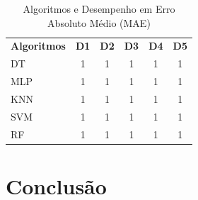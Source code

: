 \documentclass[12pt]{article}
\begin{document}
\begin{table}[h!]
  \begin{center}
    \caption{Algoritmos e Desempenho em Erro Absoluto Médio (MAE) }
    \label{tab_desempenho}
    \begin{tabular}{l|c|c|c|c|c}
      \textbf{Algoritmos} & \textbf{D1} & \textbf{D2} & \textbf{D3} & \textbf{D4} & \textbf{D5} \\
      DT                  & 1           & 1           & 1           & 1           & 1           \\
      MLP                 & 1           & 1           & 1           & 1           & 1           \\
      KNN                 & 1           & 1           & 1           & 1           & 1           \\
      SVM                 & 1           & 1           & 1           & 1           & 1           \\
      RF                  & 1           & 1           & 1           & 1           & 1           \\
    \end{tabular}
  \end{center}
\end{table}



\section{Conclusão}\label{sec:figs}






\end{document}
